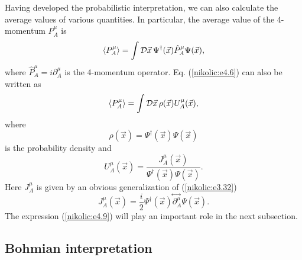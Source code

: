 \documentclass[12pt,twoside]{report} %
\begin{document}
Having developed the probabilistic interpretation, we can also calculate the average values
of various quantities. In particular, the average value of the 4-momentum
$P^{\mu}_A$ is
\begin{equation}\label{nikolic:e4.6}
 \langle P^{\mu}_A \rangle= \int {\cal D}\vec{x} \, \Psi^{\dagger}(\vec{x}) \hat{P}^{\mu}_A
\Psi(\vec{x}) ,
\end{equation}
where $\hat{P}^{\mu}_A=i\partial^{\mu}_A$ is the 4-momentum operator.
Eq. (\ref{nikolic:e4.6})  can also be written as
\begin{equation}\label{nikolic:e4.9}
 \langle P^{\mu}_A \rangle= \int {\cal D}\vec{x}\, \rho(\vec{x}) U^{\mu}_A(\vec{x}) ,
\end{equation}
where
\begin{equation}\label{nikolic:e4.10}
\rho(\vec{x})=\Psi^{\dagger}(\vec{x})\Psi(\vec{x})
\end{equation}
is the probability density and
\begin{equation}\label{nikolic:e4.11}
 U^{\mu}_A(\vec{x})=\frac{J^{\mu}_A(\vec{x})}{\Psi^{\dagger}(\vec{x})\Psi(\vec{x})} .
\end{equation}
Here $J^{\mu}_A$ is given by an obvious generalization of (\ref{nikolic:e3.32}) 
\begin{equation}\label{nikolic:e4.12}
 J^{\mu}_A(\vec{x})=
\frac{i}{2} \Psi^{\dagger}(\vec{x})\!\stackrel{\leftrightarrow\;}{\partial^{\mu}_A}\! 
\Psi (\vec{x}) .
\end{equation}
The expression (\ref{nikolic:e4.9}) will play an important role in the next subsection.


\subsection{Bohmian interpretation}
\end{document}
